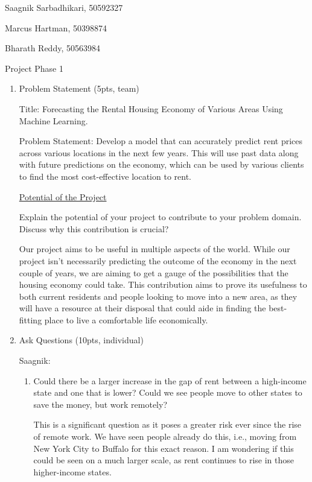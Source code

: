 \documentclass[a4paper]{article}
\begin{document}
Saagnik Sarbadhikari, 50592327 

Marcus Hartman, 50398874

Bharath Reddy, 50563984

\begin{center}
  Project Phase 1
\end{center}

\begin{enumerate}
  \item Problem Statement (5pts, team)
  
  Title: Forecasting the Rental Housing Economy of Various Areas Using Machine Learning.

  Problem Statement: Develop a model that can accurately predict rent prices across various locations in the next few years. This will use past data along with future predictions on the economy, which can be used by various clients to find the most cost-effective location to rent.

  \bigbreak
  \underline{Potential of the Project}
  
  Explain the potential of your project to contribute to your problem domain. Discuss why this contribution is crucial?

  Our project aims to be useful in multiple aspects of the world. While our project isn't necessarily predicting the outcome of the economy in the next couple of years, we are aiming to get a gauge of the possibilities that the housing economy could take. This contribution aims to prove its usefulness to both current residents and people looking to move into a new area, as they will have a resource at their disposal that could aide in finding the best-fitting place to live a comfortable life economically.

  \item Ask Questions (10pts, individual)
  
  Saagnik:

\begin{enumerate}
    \item Could there be a larger increase in the gap of rent between a high-income state and one that is lower? Could we see people move to other states to save the money, but work remotely?

    \bigbreak
    This is a significant question as it poses a greater risk ever since the rise of remote work. We have seen people already do this, i.e., moving from New York City to Buffalo for this exact reason. I am wondering if this could be seen on a much larger scale, as rent continues to rise in those higher-income states.


\end{enumerate}
\end{enumerate}
\end{document}
